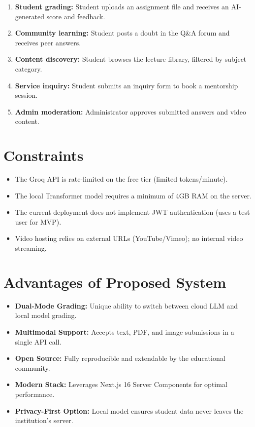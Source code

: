 \documentclass[12pt,a4paper]{report}
\begin{document}
\begin{enumerate}
    \item \textbf{Student grading:} Student uploads an assignment file and receives an AI-generated score and feedback.
    \item \textbf{Community learning:} Student posts a doubt in the Q\&A forum and receives peer answers.
    \item \textbf{Content discovery:} Student browses the lecture library, filtered by subject category.
    \item \textbf{Service inquiry:} Student submits an inquiry form to book a mentorship session.
    \item \textbf{Admin moderation:} Administrator approves submitted answers and video content.
\end{enumerate}

\section{Constraints}
\begin{itemize}
    \item The Groq API is rate-limited on the free tier (limited tokens/minute).
    \item The local Transformer model requires a minimum of 4GB RAM on the server.
    \item The current deployment does not implement JWT authentication (uses a test user for MVP).
    \item Video hosting relies on external URLs (YouTube/Vimeo); no internal video streaming.
\end{itemize}

\section{Advantages of Proposed System}
\begin{itemize}
    \item \textbf{Dual-Mode Grading:} Unique ability to switch between cloud LLM and local model grading.
    \item \textbf{Multimodal Support:} Accepts text, PDF, and image submissions in a single API call.
    \item \textbf{Open Source:} Fully reproducible and extendable by the educational community.
    \item \textbf{Modern Stack:} Leverages Next.js 16 Server Components for optimal performance.
    \item \textbf{Privacy-First Option:} Local model ensures student data never leaves the institution's server.
\end{itemize}
\end{document}
